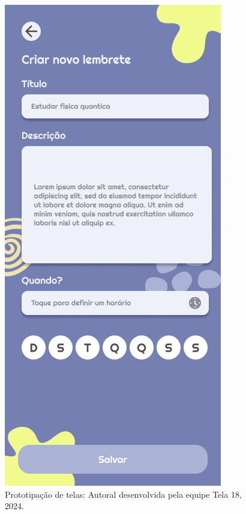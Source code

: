 \documentclass[12pt, openany, oneside, a4paper, english, brazil]{abntex2}   %
\begin{document}
\begin{figure}
    \centering
    \includegraphics[scale=0.7]{figuras/Math.Pow App/Set a Reminder.png}
    \caption{Prototipação de telas: Autoral desenvolvida pela equipe Tela 18, 2024.}
    \label{fig:nome-da-imagem}
\end{figure}
\end{document}
